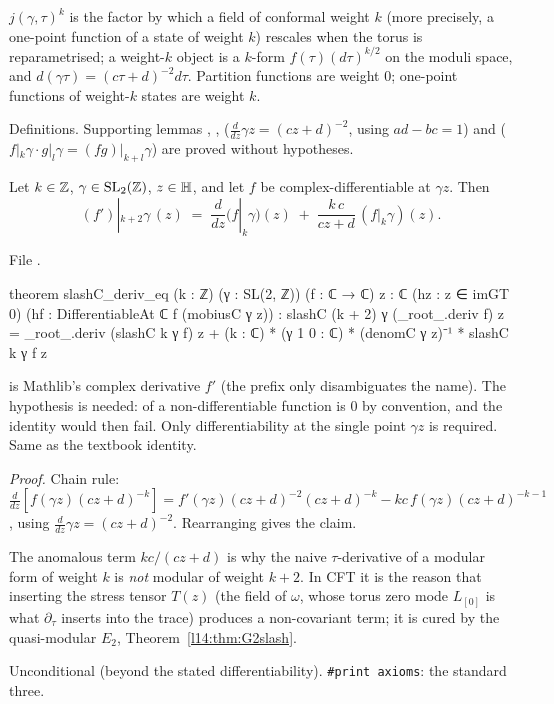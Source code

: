 \begin{physics}
$j(\gamma,\tau)^k$ is the factor by which a field of conformal weight $k$ (more precisely, a one-point function of a state
of weight $k$) rescales when the torus is reparametrised; a weight-$k$ object is a $k$-form $f(\tau)(d\tau)^{k/2}$ on the
moduli space, and $d(\gamma\tau) = (c\tau+d)^{-2}d\tau$. Partition functions are weight $0$; one-point functions of weight-$k$
states are weight $k$.
\end{physics}
\begin{status}
Definitions. Supporting lemmas , , 
($\frac{d}{dz}\gamma z = (cz+d)^{-2}$, using $ad-bc=1$) and 
($f|_{k}\gamma\cdot g|_l\gamma = (fg)|_{k+l}\gamma$) are proved without hypotheses.
\end{status}

\begin{theorem}\label{l14:thm:slashderiv}
Let $k\in{\mathbb{Z}}$, $\gamma\in\mathrm{SL}_2(\mathbb{Z})$, $z\in\mathbb{H}$, and let $f$ be complex-differentiable at $\gamma z$. Then
\begin{equation*}
  (f')|_{k+2}\gamma\,(z) \;=\; \frac{d}{dz}\bigl(f|_k\gamma\bigr)(z) \;+\; \frac{k\,c}{cz+d}\,(f|_k\gamma)(z).
\end{equation*}
\end{theorem}
\noindent File .
\begin{leancode}
theorem slashC_deriv_eq (k : ℤ) (γ : SL(2, ℤ)) (f : ℂ → ℂ) {z : ℂ} (hz : z ∈ imGT 0)
    (hf : DifferentiableAt ℂ f (mobiusC γ z)) :
    slashC (k + 2) γ (_root_.deriv f) z
      = _root_.deriv (slashC k γ f) z
        + (k : ℂ) * (γ 1 0 : ℂ) * (denomC γ z)⁻¹ * slashC k γ f z
\end{leancode}
\begin{dictionary}
 is Mathlib's complex derivative $f'$ (the prefix  only disambiguates the name). The
hypothesis  is needed:  of a non-differentiable function is $0$ by convention, and the identity would
then fail. Only differentiability at the single point $\gamma z$ is required. Same as the textbook identity.
\end{dictionary}
\noindent\emph{Proof.} Chain rule: $\frac{d}{dz}[f(\gamma z)(cz+d)^{-k}] = f'(\gamma z)(cz+d)^{-2}(cz+d)^{-k} -
kc\,f(\gamma z)(cz+d)^{-k-1}$, using $\frac{d}{dz}\gamma z = (cz+d)^{-2}$. Rearranging gives the claim.
\begin{physics}
The anomalous term $kc/(cz+d)$ is why the naive $\tau$-derivative of a modular form of weight $k$ is \emph{not} modular of
weight $k+2$. In CFT it is the reason that inserting the stress tensor $T(z)$ (the field of $\omega$, whose torus zero mode $L_{[0]}$ is what $\partial_\tau$ inserts
into the trace) produces a non-covariant term; it is cured by the quasi-modular $E_2$, Theorem~\ref{l14:thm:G2slash}.
\end{physics}
\begin{status}
Unconditional (beyond the stated differentiability). \texttt{\#print axioms}: the standard three.
\end{status}

